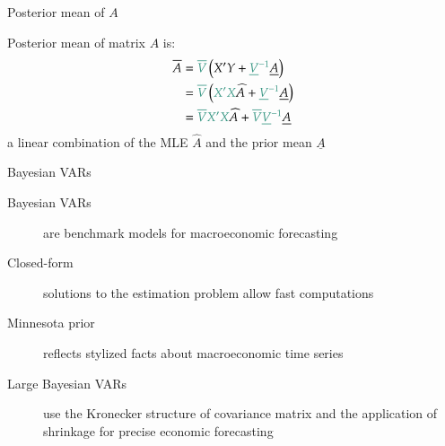 \documentclass[notes,blackandwhite,mathsans,usenames,dvipsnames]{beamer}
\begin{document}
\begin{frame}{Posterior mean of $A$}

{\color{mcxs2}Posterior mean of matrix} $A$ {\color{mcxs2}is:}
\begin{align*}
\overline{A} &= {\color{mcxs2}\overline{V}}\left( X'Y + {\color{mcxs2}\underline{V}^{-1}}\underline{A} \right)\\ 
&= {\color{mcxs2}\overline{V}}\left( {\color{mcxs2}X'X}\widehat{A} + {\color{mcxs2}\underline{V}^{-1}}\underline{A} \right)\\ 
&= {\color{mcxs2}\overline{V} X'X}\widehat{A} + {\color{mcxs2}\overline{V}\underline{V}^{-1}}\underline{A} 
\end{align*}
{\color{mcxs2}a linear combination of the MLE} $\widehat{A}$ {\color{mcxs2}and the prior mean} $\underline{A}$

\end{frame}


{
\begin{frame}{\color{mcxs1}Bayesian VARs}
\begin{description}
\item[Bayesian VARs] {\color{mcxs5}are benchmark models for macroeconomic forecasting}

\smallskip\item[Closed-form] {\color{mcxs5}solutions to the estimation problem allow fast computations}

\smallskip\item[Minnesota prior] {\color{mcxs5}reflects stylized facts about macroeconomic time series}

\smallskip\item[Large Bayesian VARs] {\color{mcxs5}use the Kronecker structure of covariance matrix and the application of shrinkage for precise economic forecasting}
\end{description}
\end{frame}
}
\end{document}
